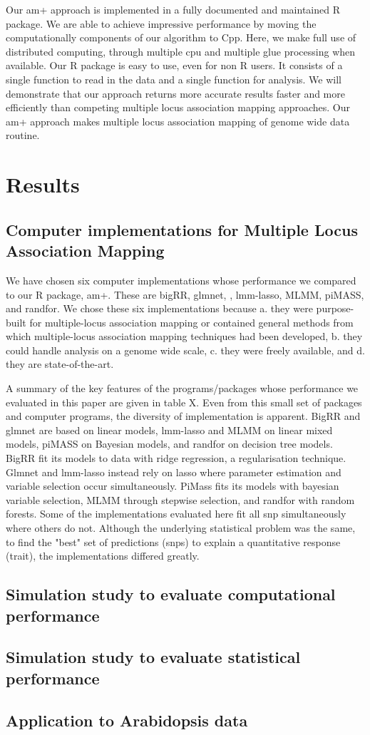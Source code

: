 \documentclass[12pt]{article}
\begin{document}
Our am+ approach is implemented in a fully documented and maintained R package. 
We are able to achieve impressive performance by moving the computationally 
components of our algorithm to Cpp. Here, we make full use of distributed 
computing, through multiple cpu and multiple glue processing when available. 
Our R package is easy to use, even for non  R users. It consists of a single function
 to read in the data and a single function for analysis. We will demonstrate that 
 our approach returns more accurate results faster and more efficiently than 
 competing multiple locus association mapping approaches. Our am+ approach 
 makes multiple locus association mapping of genome wide data routine.

\section{Results}

\subsection{Computer implementations for Multiple Locus Association Mapping}



We have chosen six computer implementations whose performance we  
compared  to our R package, am+. These are bigRR, glmnet, , lmm-lasso,
MLMM,  piMASS, and randfor.  We chose 
these six implementations because a. they were purpose-built for 
multiple-locus association mapping or contained general methods from 
which multiple-locus association mapping techniques had been developed, 
b. they could handle analysis on a genome wide scale, c.  they were freely 
available, and d. they are state-of-the-art. 

A summary of the key 
features of the programs/packages whose 
performance we evaluated in this paper are given in table X.
Even from this small set of 
packages and computer programs, the diversity of implementation is apparent. 
BigRR and glmnet are based 
on linear models, lmm-lasso and MLMM on linear mixed models, piMASS on Bayesian models, 
and randfor on decision tree models. BigRR fit its models to data with ridge regression, a regularisation technique. 
Glmnet and lmm-lasso instead rely on lasso where parameter estimation and variable selection occur simultaneously. 
PiMass fits its models with bayesian variable selection, MLMM through stepwise selection, and randfor with random forests. 
Some of the implementations evaluated here fit all snp simultaneously where others do not. Although the underlying statistical 
problem was the same, to find the "best" set of predictions (snps) to explain a quantitative response (trait), the implementations differed greatly. 

\subsection{Simulation study to evaluate computational performance}

\subsection{Simulation study to evaluate statistical performance}

\subsection{Application to Arabidopsis data}
\end{document}
